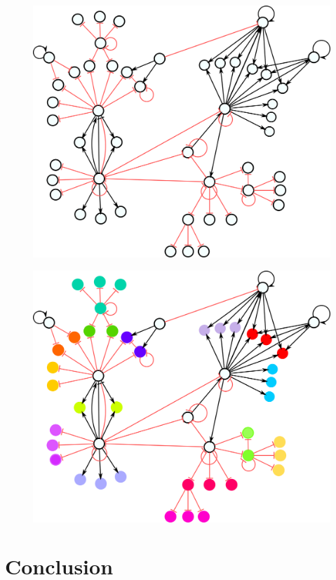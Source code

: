\documentclass[12pt]{diazessay} %
\begin{document}
\begin{figure}[h]
	\centering
	\includegraphics[scale=0.3]{Figures/result3.png}
\end{figure}
\begin{figure}[h]
	\centering
	\includegraphics[scale=0.3]{Figures/result3-1.png}
\end{figure}


\section{Conclusion}
\end{document}
